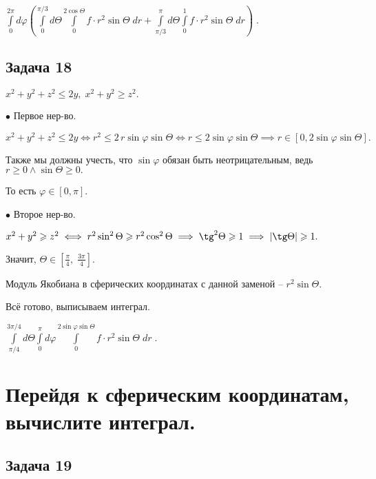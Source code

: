 \documentclass[a4paper, fleqn]{article}
\begin{document}
    $\boxed{\displaystyle \int\limits_{0 }^{2 \pi} d \varphi\left( 
    \int\limits_{0 }^{\pi/3} d \Theta \int\limits_{0 }^{2 \cos \Theta} f \cdot r^2 \sin \Theta \; dr + 
    \int\limits_{\pi/3 }^{\pi} d \Theta \int\limits_{0 }^{1} f \cdot r^2 \sin \Theta \; dr
    \right) } \; .$
    
    
    
    
    \subsection*{Задача 18}
    
    $x^2 + y^2 + z^2 \leq 2y, \; x^2 + y^2 \geq z^2.$
    
    
    $\bullet$  Первое нер-во.
    
    \onehalfspacing $x^2 + y^2 + z^2 \leq 2y \iff r^2 \leq 2 \, r \sin \varphi \sin \Theta \iff r \leq 2 \sin \varphi \sin \Theta \implies r \in [0, 2 \sin \varphi \sin \Theta].$
    
    \singlespacing Также мы должны учесть, что $\sin{\varphi}$ обязан быть неотрицательным, ведь $r \geq 0 \land \sin \Theta \geq 0.$
    
    То есть $\varphi \in [0, \pi].$
    
    $\bullet$  Второе нер-во.
    
    $x^2 + y^2 \geq z^2 \iff r^2 \sin^2 \Theta \geq r^2 \cos^2 \Theta \implies \tg^2 \Theta \geq 1 \implies |\tg \Theta| \geq 1.$
    
    Значит, $\Theta \in \left[ \frac{\pi}{4}, \; \frac{3\pi}{4} \right].$
    
    Модуль Якобиана в сферических координатах с данной заменой -- $r^2 \sin \Theta.$
    
    Всё готово, выписываем интеграл.
    
    $\boxed{\displaystyle
    \int \limits_{\pi/4}^{3 \pi /4} d \Theta \int \limits_{0}^{\pi} d \varphi \int \limits_{0}^{2 \sin \varphi \sin \Theta} f \cdot r^2 \sin \Theta \; dr} \; .$
    
    \section*{Перейдя к сферическим координатам, вычислите интеграл.}
    
    
    \subsection*{Задача 19}
    
\end{document}
